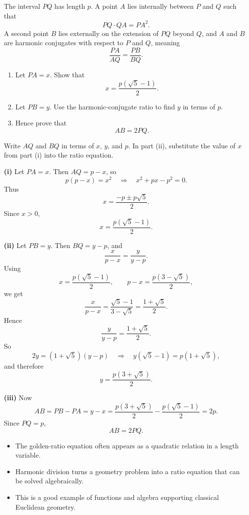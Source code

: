 \begin{problem}
The interval $PQ$ has length $p$. A point $A$ lies internally between $P$ and $Q$ such that
\[
PQ\cdot QA=PA^2.
\]
A second point $B$ lies externally on the extension of $PQ$ beyond $Q$, and $A$ and $B$ are harmonic conjugates with respect to $P$ and $Q$, meaning
\[
\frac{PA}{AQ}=\frac{PB}{BQ}.
\]
\begin{enumerate}[label=(\roman*)]
\item Let $PA=x$. Show that
\[
x=\frac{p(\sqrt5-1)}{2}.
\]
\item Let $PB=y$. Use the harmonic-conjugate ratio to find $y$ in terms of $p$.
\item Hence prove that
\[
AB=2PQ.
\]
\end{enumerate}
\end{problem}

\begin{hint}
Write $AQ$ and $BQ$ in terms of $x$, $y$, and $p$. In part (ii), substitute the value of $x$ from part (i) into the ratio equation.
\end{hint}

\begin{solution}
\textbf{(i)} Let $PA=x$. Then $AQ=p-x$, so
\[
p(p-x)=x^2
\quad\Longrightarrow\quad
x^2+px-p^2=0.
\]
Thus
\[
x=\frac{-p\pm p\sqrt5}{2}.
\]
Since $x>0$,
\[
\boxed{x=\frac{p(\sqrt5-1)}{2}.}
\]

\textbf{(ii)} Let $PB=y$. Then $BQ=y-p$, and
\[
\frac{x}{p-x}=\frac{y}{y-p}.
\]
Using
\[
x=\frac{p(\sqrt5-1)}{2},
\qquad
p-x=\frac{p(3-\sqrt5)}{2},
\]
we get
\[
\frac{x}{p-x}=\frac{\sqrt5-1}{3-\sqrt5}=\frac{1+\sqrt5}{2}.
\]
Hence
\[
\frac{y}{y-p}=\frac{1+\sqrt5}{2}.
\]
So
\[
2y=(1+\sqrt5)(y-p)
\quad\Longrightarrow\quad
y(\sqrt5-1)=p(1+\sqrt5),
\]
and therefore
\[
\boxed{y=\frac{p(3+\sqrt5)}{2}.}
\]

\textbf{(iii)} Now
\[
AB=PB-PA=y-x
=\frac{p(3+\sqrt5)}{2}-\frac{p(\sqrt5-1)}{2}
=2p.
\]
Since $PQ=p$,
\[
\boxed{AB=2PQ.}
\]
\end{solution}

\begin{takeaways}
\begin{itemize}[leftmargin=*]
\item The golden-ratio equation often appears as a quadratic relation in a length variable.
\item Harmonic division turns a geometry problem into a ratio equation that can be solved algebraically.
\item This is a good example of functions and algebra supporting classical Euclidean geometry.
\end{itemize}
\end{takeaways}

